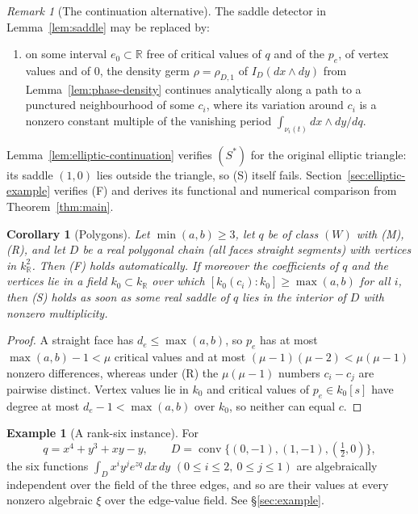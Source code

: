 \documentclass[11pt]{article}
\numberwithin{equation}{section}
\newtheorem{corollary}[corollary]{Corollary}
\theoremstyle{definition}
\newtheorem{example}[example]{Example}
\theoremstyle{remark}
\newtheorem{remark}[remark]{Remark}
\newcommand{\R}{\mathbb R}
\newcommand{\dd}{\,d}
\begin{document}
\begin{remark}[The continuation alternative]\label{rem:Sstar}
The saddle detector in Lemma~\ref{lem:saddle} may be replaced by:
\begin{enumerate}[leftmargin=2.6em]
\item[(S$^*$)] on some interval $e_0\subset\R$ free of critical values of $q$
 and of the $p_e$, of vertex values and of $0$, the density germ
 $\rho=\rho_{D,1}$ of $I_D(dx\wedge dy)$ from
 Lemma~\ref{lem:phase-density} continues analytically along a path to a punctured
 neighbourhood of some $c_i$, where its variation around $c_i$ is a nonzero
 constant multiple of the vanishing period $\int_{\nu_i(t)}dx\wedge dy/dq$.
\end{enumerate}
Lemma~\ref{lem:elliptic-continuation} verifies $(S^*)$ for the original
elliptic triangle: its saddle $(1,0)$ lies outside the triangle, so (S)
itself fails. Section~\ref{sec:elliptic-example} verifies (F) and derives
its functional and numerical comparison from Theorem~\ref{thm:main}.
\end{remark}

\begin{corollary}[Polygons]\label{cor:polygon}
Let $\min(a,b)\ge3$, let $q$ be of class $(W)$ with \textup{(M)}, \textup{(R)},
and let $D$ be a real polygonal chain (all faces straight segments) with vertices
in $k_\R^2$. Then \textup{(F)} holds automatically. If moreover the coefficients
of $q$ and the vertices lie in a field $k_0\subset k_\R$ over which
$[k_0(c_i):k_0]\ge\max(a,b)$ for all $i$, then \textup{(S)} holds as soon as some
real saddle of $q$ lies in the interior of $D$ with nonzero multiplicity.
\end{corollary}
\begin{proof}
A straight face has $d_e\le\max(a,b)$, so $p_e$ has at most $\max(a,b)-1<\mu$
critical values and at most $(\mu-1)(\mu-2)<\mu(\mu-1)$ nonzero differences,
whereas under (R) the $\mu(\mu-1)$ numbers $c_i-c_j$ are pairwise distinct.
Vertex values lie in $k_0$ and critical values of $p_e\in k_0[s]$ have degree at
most $d_e-1<\max(a,b)$ over $k_0$, so neither can equal $c$.
\end{proof}

\begin{example}[A rank-six instance]\label{ex:intro}
For
\[
 q=x^4+y^3+xy-y,\qquad D=\operatorname{conv}\{(0,-1),(1,-1),(\tfrac12,0)\},
\]
the six functions $\int_D x^iy^je^{zq}\dd x\dd y$ $(0\le i\le2,\ 0\le j\le1)$ are
algebraically independent over the field of the three edges, and so are their
values at every nonzero algebraic $\xi$ over the edge-value field. See
\S\ref{sec:example}.
\end{example}
\end{document}
